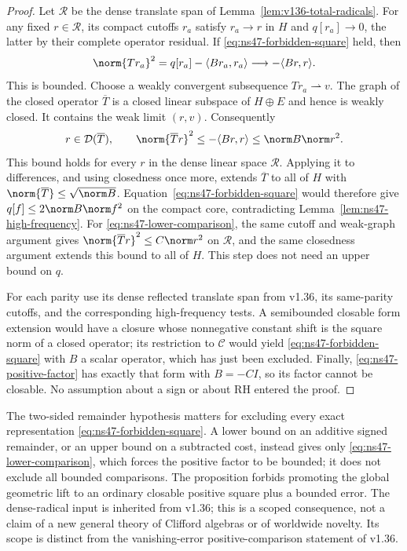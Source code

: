 \begin{proof}
Let $\mathcal R$ be the dense translate span of
Lemma~\ref{lem:v136-total-radicals}. For any fixed $r\in\mathcal R$,
its compact cutoffs $r_a$ satisfy $r_a\to r$ in $H$ and
$q[r_a]\to0$, the latter by their complete operator residual.
If \eqref{eq:ns47-forbidden-square} held, then
\[
 \norm{Tr_a}^2=q[r_a]-\langle Br_a,r_a\rangle
                   \longrightarrow-\langle Br,r\rangle.
\]
This is bounded. Choose a weakly convergent subsequence
$Tr_a\rightharpoonup v$. The graph of the closed operator
$\overline T$ is a closed linear subspace of $H\oplus E$ and
hence is weakly closed. It contains the weak limit $(r,v)$.
Consequently
\[
 r\in\mathcal D(\overline T),\qquad
 \norm{\overline T r}^2\le-\langle Br,r\rangle
                      \le\norm B\norm r^2.
\]
This bound holds for every $r$ in the dense linear space
$\mathcal R$. Applying it to differences, and using closedness
once more, extends $\overline T$ to all of $H$ with
$\norm{\overline T}\le\sqrt{\norm B}$.
Equation~\eqref{eq:ns47-forbidden-square} would therefore give
$q[f]\le2\norm B\norm f^2$ on the compact core, contradicting
Lemma~\ref{lem:ns47-high-frequency}.
For \eqref{eq:ns47-lower-comparison}, the same cutoff and weak-graph
argument gives $\norm{\overline T r}^2\le C\norm r^2$ on
$\mathcal R$, and the same closedness argument extends this bound
to all of $H$. This step does not need an upper bound on $q$.

For each parity use its dense reflected translate span from v1.36,
its same-parity cutoffs, and the corresponding high-frequency tests.
A semibounded closable form extension would have a closure whose
nonnegative constant shift is the square norm of a closed operator;
its restriction to $\mathcal C$ would yield
\eqref{eq:ns47-forbidden-square} with $B$ a scalar operator, which
has just been excluded. Finally, \eqref{eq:ns47-positive-factor}
has exactly that form with $B=-CI$, so its factor cannot be
closable. No assumption about a sign or about RH entered the proof.
\end{proof}

The two-sided remainder hypothesis matters for excluding every exact
representation \eqref{eq:ns47-forbidden-square}. A lower bound on an
additive signed remainder, or an upper bound on a subtracted cost,
instead gives only \eqref{eq:ns47-lower-comparison}, which forces the positive factor
to be bounded; it does not exclude all bounded comparisons. The
proposition forbids promoting the global geometric lift to an ordinary
closable positive square plus a bounded error. The dense-radical input
is inherited from v1.36;
this is a scoped consequence, not a claim of a new general theory of
Clifford algebras or of worldwide novelty. Its scope is distinct from
the vanishing-error positive-comparison statement of v1.36.

